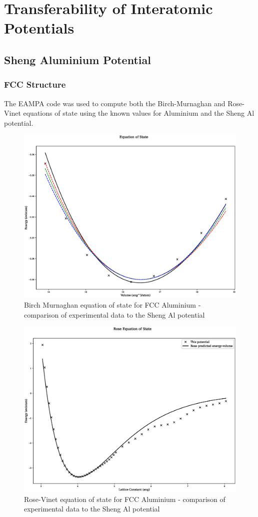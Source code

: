 \chapter{Transferability of Interatomic Potentials}
\label{section:transferabilityappendix}


\section{Sheng Aluminium Potential}
\label{section:alshengxfer}

\subsection{FCC Structure}

The EAMPA code was used to compute both the Birch-Murnaghan and Rose-Vinet equations of state using the known values for Aluminium and the Sheng Al potential\cite{shengeamonline}.  
 
\begin{figure}
  \begin{center}
    \includegraphics[width=0.6\linewidth]{appendix/transferability/transferability/Al_sheng/equation_of_state_bp_fcc.eps}
  \end{center}
	\caption{Birch Murnaghan equation of state for FCC Aluminium - comparison of experimental data to the Sheng Al potential}
	\label{fig:shengalfccbm}
\end{figure}

\begin{figure}
  \begin{center}
    \includegraphics[width=0.6\linewidth]{appendix/transferability/transferability/Al_sheng/rose_plot_bp_fcc.eps}
  \end{center}
	\caption{Rose-Vinet equation of state for FCC Aluminium - comparison of experimental data to the Sheng Al potential}
	\label{fig:shengalfccbm}
\end{figure}

